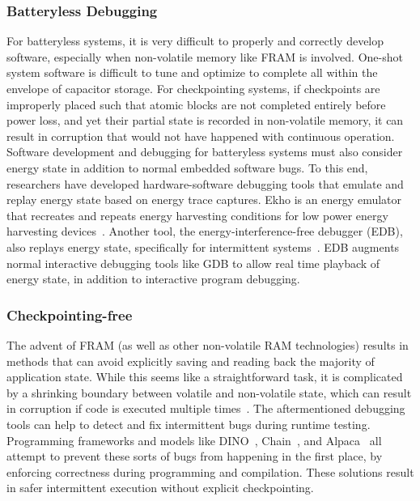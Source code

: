 \subsubsection{Batteryless Debugging}
For batteryless systems, it
is very difficult to properly and correctly develop software, especially when non-volatile memory like FRAM is involved.
One-shot system software is difficult to tune and optimize to complete all within the envelope of capacitor storage.
For checkpointing systems, if checkpoints are improperly placed such that atomic blocks are not completed entirely before power loss, and yet their partial state is recorded in non-volatile memory,
it can result in corruption that would not have happened with continuous operation.
Software development and debugging for batteryless systems must also consider energy state in addition to normal embedded software bugs.
To this end, researchers have developed hardware-software debugging tools that emulate and replay energy state based on energy trace captures.
Ekho is an energy emulator that recreates and repeats energy harvesting conditions for low power energy harvesting devices~\cite{hester2014ekho}.
Another tool, the energy-interference-free debugger (EDB), also replays energy state, specifically for intermittent systems~\cite{colin2016energy}.
EDB augments normal interactive debugging tools like GDB to allow real time playback of energy state, in addition to interactive program debugging.

\subsubsection{Checkpointing-free}
The advent of FRAM (as well as other non-volatile RAM technologies) results in methods that can avoid explicitly saving and reading back the majority of application state.
While this seems like a straightforward task, it is complicated by a shrinking
boundary between volatile and non-volatile state, which can result in corruption if code is executed multiple times~\cite{maeng2017alpaca}.
The aftermentioned debugging tools can help to detect and fix intermittent bugs during runtime testing.
Programming frameworks and models like DINO~\cite{lucia2015simpler}, Chain~\cite{colin2016chain},
and Alpaca~\cite{maeng2017alpaca} all attempt to prevent these sorts of bugs from happening in the first place, by enforcing correctness during programming and compilation.
These solutions result in safer intermittent execution without explicit checkpointing.

